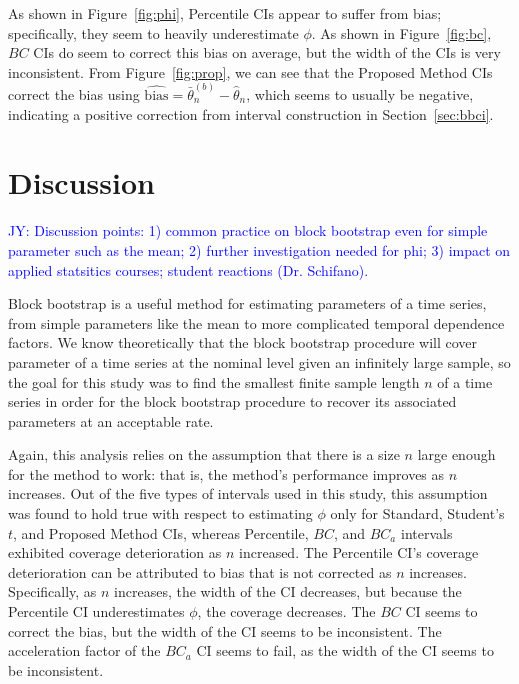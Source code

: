 \documentclass[12pt, letterpaper, titlepage]{article}
\newcommand{\jy}[1]{\textcolor{blue}{JY: #1}}
\begin{document}
As shown in Figure~\ref{fig:phi}, Percentile CIs appear to suffer from bias;
specifically, they seem to heavily underestimate $\phi$. As shown in
Figure~\ref{fig:bc}, $BC$ CIs do seem to correct this bias on average, but the width of
  the 
CIs is very inconsistent. From Figure~\ref{fig:prop}, we can see that the 
Proposed Method CIs correct the bias using 
$\widehat{\text{bias}} = \bar\theta_n^{(b)} -
  \hat\theta_n$, which seems to usually be negative, indicating a positive 
	correction from interval construction in Section~\ref{sec:bbci}.

\section{Discussion}
\label{sec:disc}

\jy{Discussion points:
  1) common practice on block bootstrap even for simple parameter such as the
  mean;
  2) further investigation needed for phi;
  3) impact on applied statsitics courses; student reactions (Dr. Schifano).
}

Block bootstrap is a useful method for estimating parameters of a time
series, from simple parameters like the mean to more complicated temporal
 dependence factors.
 We know theoretically that the block bootstrap procedure will cover
  parameter of a time series at the nominal level given an
 infinitely large
sample, so the goal for this study was to find the smallest finite
sample length $n$ of a time series in order for the block bootstrap procedure
to 
recover its associated parameters at an acceptable rate.

Again, this analysis relies on the assumption that
there is a size $n$ large enough for the method to work: that is, the method's
performance improves as $n$ increases. Out of the five types of intervals used
in this study, this assumption was found to hold true with respect to
estimating $\phi$ only for Standard, Student's $t$, and Proposed Method CIs, 
whereas Percentile, 
$BC$, and $BC_a$ intervals exhibited coverage deterioration as $n$
increased. The Percentile CI's coverage deterioration can be attributed to
bias that is not corrected as $n$ increases. Specifically, as $n$ increases, 
the width of the CI decreases, but because the Percentile CI
underestimates $\phi$, the coverage decreases. The $BC$ CI seems to correct the 
bias, but the width of the CI seems to be inconsistent. The acceleration 
factor of the $BC_a$ CI seems to fail, as the width of the CI
seems to be inconsistent. 
\end{document}
